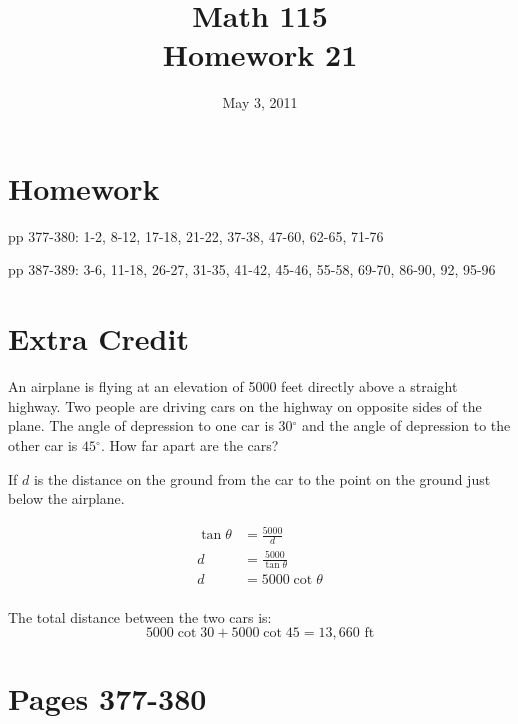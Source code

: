 \documentclass[fleqn,addpoints]{exam}
\title{Math 115 \\ Homework 21}
\date{May 3, 2011}
\newcommand{\degree}{\ensuremath{^\circ}}
\begin{document}
\maketitle


\ifprintanswers
\else
\section{Homework}
\begin{itemize*}
  \item pp 377-380: 1-2, 8-12, 17-18, 21-22, 37-38, 47-60, 62-65, 71-76
  \item pp 387-389: 3-6, 11-18, 26-27, 31-35, 41-42, 45-46, 55-58, 69-70, 86-90, 92, 95-96
\end{itemize*}


\fi

\section{Extra Credit}

An airplane is flying at an elevation of 5000 feet directly above a straight highway.  Two people are driving cars on
the highway on opposite sides of the plane.  The angle of depression to one car is $30 \degree$ and the angle of
depression to the other car is $45 \degree$.  How far apart are the cars?

\begin{solution}
If $d$ is the distance on the ground from the car to the point on the ground just below the airplane.

\begin{align*}
  \tan \theta &= \frac{5000}{d} \\
  d &= \frac{5000}{\tan \theta} \\
  d &= 5000 \cot \theta \\
\end{align*}

The total distance between the two cars is:
\[
  5000 \cot 30 + 5000 \cot 45 = 13,660 \text{ ft}
\]

\end{solution}

\ifprintanswers
\section{Pages 377-380}
\end{document}
